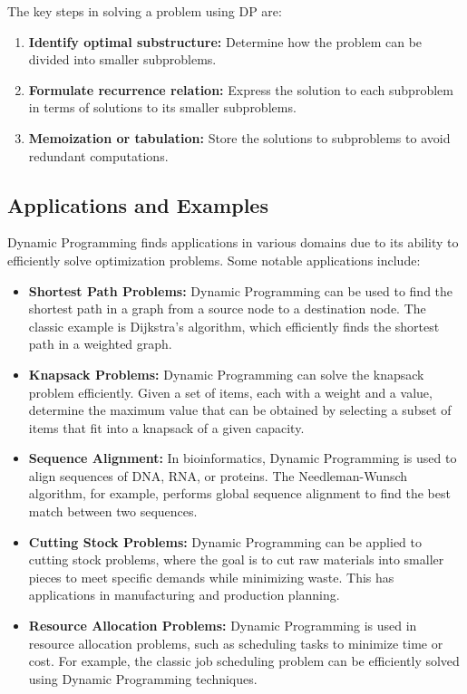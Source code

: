 \documentclass[12pt]{book} %
\begin{document}
The key steps in solving a problem using DP are:
\begin{enumerate}
    \item \textbf{Identify optimal substructure:} Determine how the problem can be divided into smaller subproblems.
    \item \textbf{Formulate recurrence relation:} Express the solution to each subproblem in terms of solutions to its smaller subproblems.
    \item \textbf{Memoization or tabulation:} Store the solutions to subproblems to avoid redundant computations.
\end{enumerate}

\subsection{Applications and Examples}
Dynamic Programming finds applications in various domains due to its ability to efficiently solve optimization problems. Some notable applications include:

\begin{itemize}
    \item \textbf{Shortest Path Problems:} Dynamic Programming can be used to find the shortest path in a graph from a source node to a destination node. The classic example is Dijkstra's algorithm, which efficiently finds the shortest path in a weighted graph.
    
    \item \textbf{Knapsack Problems:} Dynamic Programming can solve the knapsack problem efficiently. Given a set of items, each with a weight and a value, determine the maximum value that can be obtained by selecting a subset of items that fit into a knapsack of a given capacity.
    
    \item \textbf{Sequence Alignment:} In bioinformatics, Dynamic Programming is used to align sequences of DNA, RNA, or proteins. The Needleman-Wunsch algorithm, for example, performs global sequence alignment to find the best match between two sequences.
    
    \item \textbf{Cutting Stock Problems:} Dynamic Programming can be applied to cutting stock problems, where the goal is to cut raw materials into smaller pieces to meet specific demands while minimizing waste. This has applications in manufacturing and production planning.
    
    \item \textbf{Resource Allocation Problems:} Dynamic Programming is used in resource allocation problems, such as scheduling tasks to minimize time or cost. For example, the classic job scheduling problem can be efficiently solved using Dynamic Programming techniques.
\end{itemize}
\end{document}
